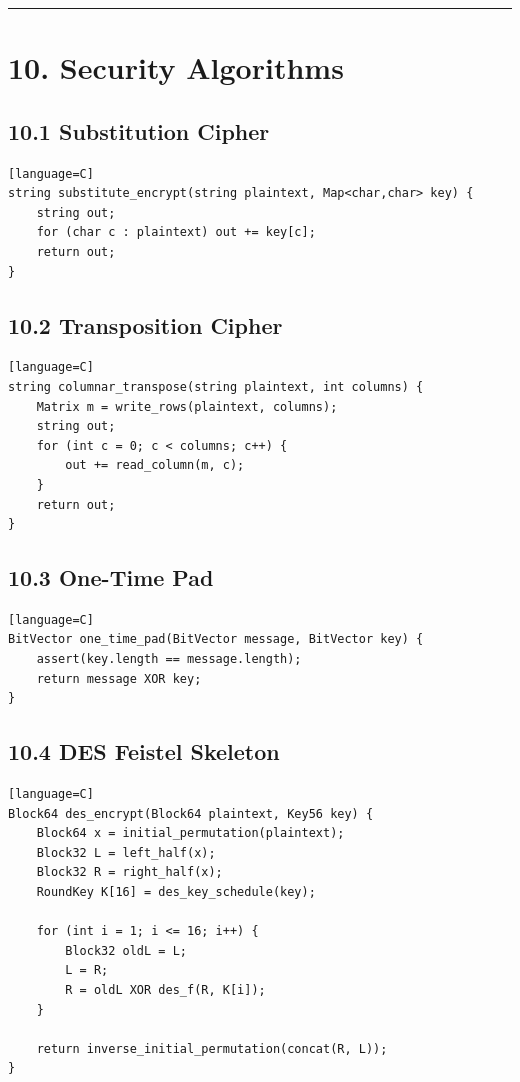 \documentclass[11pt]{article}
\begin{document}
\begin{center}\rule{0.5\linewidth}{0.5pt}\end{center}

\section{10. Security Algorithms}\label{security-algorithms}

\subsection{10.1 Substitution Cipher}\label{substitution-cipher}

\begin{verbatim}[language=C]
string substitute_encrypt(string plaintext, Map<char,char> key) {
    string out;
    for (char c : plaintext) out += key[c];
    return out;
}
\end{verbatim}

\subsection{10.2 Transposition Cipher}\label{transposition-cipher}

\begin{verbatim}[language=C]
string columnar_transpose(string plaintext, int columns) {
    Matrix m = write_rows(plaintext, columns);
    string out;
    for (int c = 0; c < columns; c++) {
        out += read_column(m, c);
    }
    return out;
}
\end{verbatim}

\subsection{10.3 One-Time Pad}\label{one-time-pad}

\begin{verbatim}[language=C]
BitVector one_time_pad(BitVector message, BitVector key) {
    assert(key.length == message.length);
    return message XOR key;
}
\end{verbatim}

\subsection{10.4 DES Feistel Skeleton}\label{des-feistel-skeleton}

\begin{verbatim}[language=C]
Block64 des_encrypt(Block64 plaintext, Key56 key) {
    Block64 x = initial_permutation(plaintext);
    Block32 L = left_half(x);
    Block32 R = right_half(x);
    RoundKey K[16] = des_key_schedule(key);

    for (int i = 1; i <= 16; i++) {
        Block32 oldL = L;
        L = R;
        R = oldL XOR des_f(R, K[i]);
    }

    return inverse_initial_permutation(concat(R, L));
}
\end{verbatim}
\end{document}
